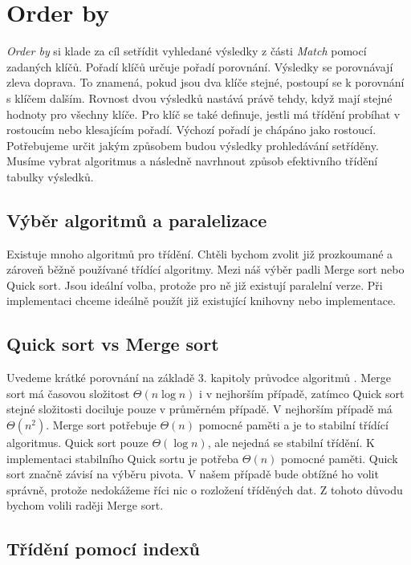 \bigskip

\section{Order by} \label{anal.orderby}

\textit{Order by} si klade za cíl setřídit vyhledané výsledky z části \textit{Match} pomocí zadaných klíčů.
Pořadí klíčů určuje pořadí porovnání.
Výsledky se porovnávají zleva doprava.
To znamená, pokud jsou dva klíče stejné, postoupí se k porovnání s klíčem dalším.
Rovnost dvou výsledků nastává právě tehdy, když mají stejné hodnoty pro všechny klíče. 
Pro klíč se také definuje, jestli má třídění probíhat v rostoucím nebo klesajícím pořadí.
Výchozí pořadí je chápáno jako rostoucí. 
Potřebujeme určit jakým způsobem budou výsledky prohledávání setříděny.
Musíme vybrat algoritmus a následně navrhnout způsob efektivního třídění tabulky výsledků.

\subsection{Výběr algoritmů a paralelizace}

Existuje mnoho algoritmů pro třídění.
Chtěli bychom zvolit již prozkoumané a zároveň běžně používané třídící algoritmy.
Mezi náš výběr padli Merge sort nebo Quick sort.
Jsou ideální volba, protože pro ně již existují paralelní verze.
Při implementaci chceme ideálně použít již existující knihovny nebo implementace. 

\subsection{Quick sort vs Merge sort}

Uvedeme krátké porovnání na základě 3. kapitoly průvodce algoritmů \citep{labyrint}. 
Merge sort má časovou složitost $ \Theta(n\log n) $ i v nejhorším případě, zatímco Quick sort stejné složitosti dociluje pouze v průměrném případě.
V nejhorším případě má $\Theta(n^2)$.
Merge sort potřebuje $\Theta(n)$ pomocné paměti a je to stabilní třídící algoritmus.
Quick sort pouze $\Theta(\log n)$, ale nejedná se stabilní třídění.
K implementaci stabilního Quick sortu je potřeba $\Theta(n)$ pomocné paměti.
Quick sort značně závisí na výběru pivota.
V našem případě bude obtížné ho volit správně, protože nedokážeme říci nic o rozložení tříděných dat.
Z tohoto důvodu bychom volili raději Merge sort.  

\subsection{Třídění pomocí indexů}

